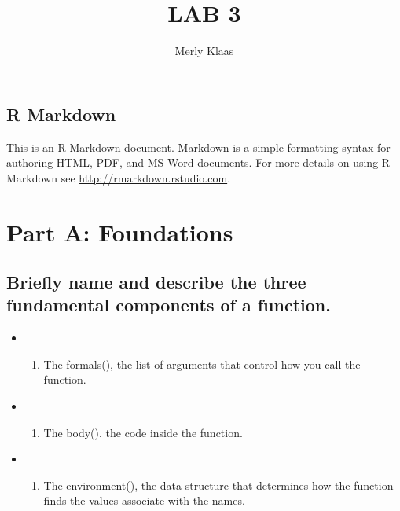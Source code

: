 \documentclass[
]{article}
\title{LAB 3}
\author{Merly Klaas}
\date{}
\providecommand{\tightlist}{%
  \setlength{\itemsep}{0pt}\setlength{\parskip}{0pt}}
\begin{document}
\maketitle

\hypertarget{r-markdown}{%
\subsection{R Markdown}\label{r-markdown}}

This is an R Markdown document. Markdown is a simple formatting syntax
for authoring HTML, PDF, and MS Word documents. For more details on
using R Markdown see \url{http://rmarkdown.rstudio.com}.

\hypertarget{part-a-foundations}{%
\section{Part A: Foundations}\label{part-a-foundations}}

\hypertarget{briefly-name-and-describe-the-three-fundamental-components-of-a-function.}{%
\subsection{Briefly name and describe the three fundamental components
of a
function.}\label{briefly-name-and-describe-the-three-fundamental-components-of-a-function.}}

\begin{itemize}
\item
  \begin{enumerate}
  \def\labelenumi{\arabic{enumi}.}
  \tightlist
  \item
    The formals(), the list of arguments that control how you call the
    function.
  \end{enumerate}
\item
  \begin{enumerate}
  \def\labelenumi{\arabic{enumi}.}
  \setcounter{enumi}{1}
  \tightlist
  \item
    The body(), the code inside the function.
  \end{enumerate}
\item
  \begin{enumerate}
  \def\labelenumi{\arabic{enumi}.}
  \setcounter{enumi}{2}
  \tightlist
  \item
    The environment(), the data structure that determines how the
    function finds the values associate with the names.
  \end{enumerate}
\end{itemize}
\end{document}
